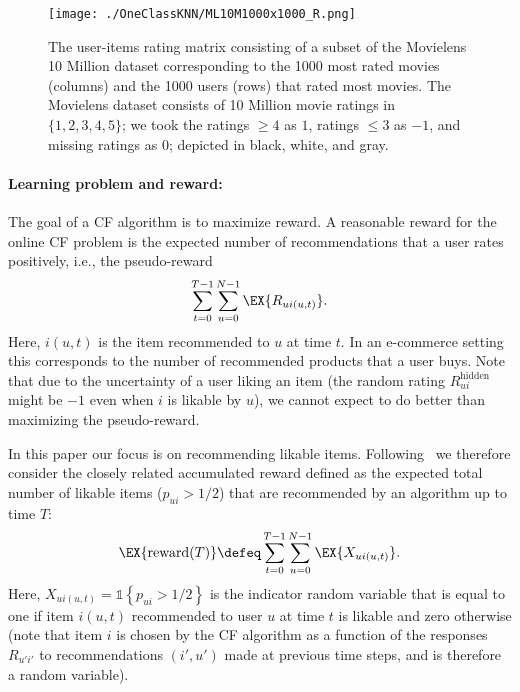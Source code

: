 \documentclass{article}
\newcommand\arewardT{\EX{\mathrm{reward}(T)}}
\newcommand\ocR{R}
\newcommand\R{R^{\mathrm{hidden}}}
\newcommand\ind[1]{\mathds{1}\left\{#1\right\}}
\begin{document}
\begin{figure}
\begin{center}
\texttt{[image: ./OneClassKNN/ML10M1000x1000\_R.png]}
\end{center}
\caption{
\label{fig:clusteringmovielens}
The user-items rating matrix consisting of a subset of the Movielens 10 Million dataset corresponding to the 1000 most rated movies (columns) and the 1000 users (rows) that rated most movies. 
The Movielens dataset consists of 10 Million movie ratings in $\{1,2,3,4,5\}$; 
we took the ratings $\geq 4$ as $1$, ratings $\leq 3$ as $-1$, and missing ratings as $0$; 
depicted in black, white, and gray.
}
\end{figure}


\paragraph{Learning problem and reward:}
The goal of a CF algorithm is to maximize reward. 
A reasonable reward for the online CF problem is the expected number of recommendations that a user rates positively, i.e., the pseudo-reward
\[
\sum_{t=0}^{T-1} \sum_{u=0}^{N-1} \EX{R_{ui(u,t)}}.
\]
Here, $i(u,t)$ is the item recommended to $u$ at time $t$. 
In an e-commerce setting this corresponds to the number of recommended products that a user buys.
Note that due to the uncertainty of a user liking an item (the random rating $\R_{ui}$ might be $-1$ even when $i$ is likable by $u$), we cannot expect to do better than maximizing the pseudo-reward. 

In this paper our focus is on recommending likable items. Following~\cite{bresler_latent_2014} we therefore consider the closely related accumulated reward defined as the expected total number of likable items ($p_{ui}>1/2$) that are recommended by an algorithm up to time $T$:
\begin{align}
\arewardT \defeq \sum_{t=0}^{T-1} \sum_{u=0}^{N-1} \EX{X_{u i(u,t)}}. 
\label{eq:defareward}
\end{align}
Here, $X_{u i(u,t)} = \ind{p_{ui} > 1/2}$ is the indicator random variable that is equal to one if item $i(u,t)$ recommended to user $u$ at time $t$ is likable and zero otherwise (note that item $i$ is chosen by the CF algorithm as a function of the responses $\ocR_{u'i'}$ to recommendations $(i',u')$ %
made at previous time steps, and is therefore a random variable). 
\end{document}
